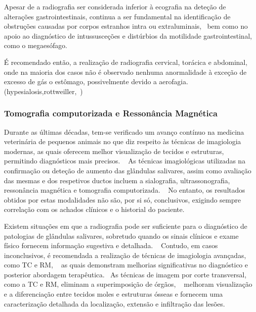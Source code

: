Apesar de a radiografia ser considerada inferior à ecografia na deteção de alterações gastrointestinais, continua a ser fundamental na identificação de obstruções causadas por corpos estranhos intra ou extraluminais,~\cite{Sharma2011} bem como no apoio ao diagnóstico de intussusceções e distúrbios da motilidade gastrointestinal, como o megaesófago. ~\cite{Jaikumar2013}


É recomendado então, a realização de radiografia cervical, torácica e abdominal, onde na maioria dos casos não é observado nenhuma anormalidade à exceção de excesso de gás o estômago, possivelmente devido a aerofagia. (hypesialosis,rottweiller,~\cite{gibbon_phenobarbital-responsive_german_2004})


\subsubsection{Tomografia computorizada e Ressonância Magnética}


Durante as últimas décadas, tem-se verificado um avanço contínuo na medicina veterinária de pequenos animais no que diz respeito às técnicas de imagiologia modernas, as quais oferecem melhor visualização de tecidos e estruturas, permitindo diagnósticos mais precisos. ~\cite{gil_anatomic_2018} As técnicas imagiológicas utilizadas na confirmação ou deteção de aumento das glândulas salivares, assim como avaliação das mesmas e dos respetivos ductos incluem a sialografia, ultrassonografia, ressonância magnética e tomografia computorizada. ~\cite{boydell_sialadenosis_2000,gil_anatomic_2018} No entanto, os resultados obtidos por estas modalidades não são, por si só, conclusivos, exigindo sempre correlação com os achados clínicos e o historial do paciente. ~\cite{boydell_sialadenosis_2000,gil_anatomic_2018}


Existem situações em que a radiografia pode ser suficiente para o diagnóstico de patologias de glândulas salivares, sobretudo quando os sinais clínicos e exame físico fornecem informação sugestiva e detalhada. ~\cite{gil_anatomic_2018,perez-ecija_granulomatous_2012} Contudo, em casos inconclusivos, é recomendada a realização de técnicas de imagiologia avançadas, como TC e RM, ~\cite{gil_anatomic_2018,durand_computed_2016} as quais demonstram melhorias significativas no diagnóstico e posterior abordagem terapêutica.~\cite{durand_computed_2016} As técnicas de imagem por corte transversal, como a TC e RM, eliminam a superimposição de órgãos, ~\cite{seiler_acvr_2022,durand_computed_2016} melhoram visualização e a diferenciação entre tecidos moles e estruturas ósseas e fornecem uma caracterização detalhada da localização, extensão e infiltração das lesões. ~\cite{durand_computed_2016}


